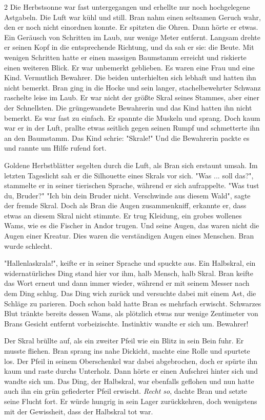 \documentclass[10pt, a4paper, oneside]{book}
\begin{document}
\begin{multicols}{2}
Die Herbstsonne war fast untergegangen und erhellte nur noch hochgelegene Astgabeln. Die Luft war kühl und still. Bran nahm einen seltsamen Geruch wahr, den er noch nicht einordnen konnte. Er spitzten die Ohren. Dann hörte er etwas. Ein Geräusch von Schritten im Laub, nur wenige Meter entfernt. Langsam drehte er seinen Kopf in die entsprechende Richtung, und da sah er sie: die Beute. Mit wenigen Schritten hatte er einen massigen Baumstamm erreicht und riskierte einen weiteren Blick. Er war unbemerkt geblieben. Es waren eine Frau und eine Kind. Vermutlich Bewahrer. Die beiden unterhielten sich lebhaft und hatten ihn nicht bemerkt. Bran ging in die Hocke und sein langer, stachelbewehrter Schwanz raschelte leise im Laub. Er war nicht der größte Skral seines Stammes, aber einer der Schnellsten. Die grüngewandete Bewahrerin und das Kind hatten ihn nicht bemerkt. Es war fast zu einfach. Er spannte die Muskeln und sprang. Doch kaum war er in der Luft, prallte etwas seitlich gegen seinen Rumpf und schmetterte ihn an den Baumstamm. Das Kind schrie: "Skrale!" Und die Bewahrerin packte es und rannte um Hilfe rufend fort. 

Goldene Herbstblätter segelten durch die Luft, als Bran sich erstaunt umsah. Im letzten Tageslicht sah er die Silhouette eines Skrals vor sich. "Was ... soll das?", stammelte er in seiner tierischen Sprache, während er sich aufrappelte. "Was tust du, Bruder?" "Ich bin dein Bruder nicht. Verschwinde aus diesem Wald", sagte der fremde Skral. Doch als Bran die Augen zusammenkniff, erkannte er, dass etwas an diesem Skral nicht stimmte. Er trug Kleidung, ein grobes wollenes Wams, wie es die Fischer in Andor trugen. Und seine Augen, das waren nicht die Augen einer Kreatur. Dies waren die verständigen Augen eines Menschen. Bran wurde schlecht.

"Hallenlaskrala!", keifte er in seiner Sprache und spuckte aus. Ein Halbskral, ein widernatürliches Ding stand hier vor ihm, halb Mensch, halb Skral. Bran keifte das Wort erneut und dann immer wieder, während er mit seinem Messer nach dem Ding schlug. Das Ding wich zurück und versuchte dabei mit einem Ast, die Schläge zu parieren. Doch schon bald hatte Bran es mehrfach erwischt. Schwarzes Blut tränkte bereits dessen Wams, als plötzlich etwas nur wenige Zentimeter von Brans Gesicht entfernt vorbeizischte. Instinktiv wandte er sich um. Bewahrer!

Der Skral brüllte auf, als ein zweiter Pfeil wie ein Blitz in sein Bein fuhr. Er musste fliehen. Bran sprang ins nahe Dickicht, machte eine Rolle und spurtete los. Der Pfeil in seinem Oberschenkel war dabei abgebrochen, doch er spürte ihn kaum und raste durchs Unterholz. Dann hörte er einen Aufschrei hinter sich und wandte sich um. Das Ding, der Halbskral, war ebenfalls geflohen und nun hatte auch ihn ein grün gefiederter Pfeil erwischt. \textit{Recht so}, dachte Bran und setzte seine Flucht fort. Er würde hungrig in sein Lager zurückkehren, doch wenigstens mit der Gewissheit, dass der Halbskral tot war.


\end{multicols}
\end{document}

